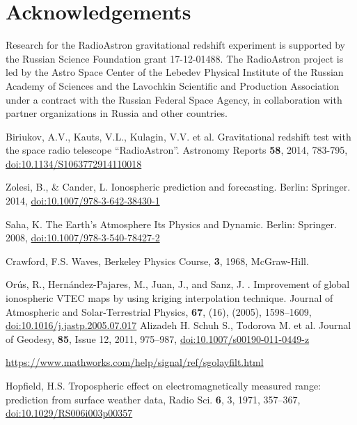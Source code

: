 \documentclass[a4paper,english,bopenany]{article}
\begin{document}
\section{Acknowledgements}

Research for the RadioAstron gravitational redshift experiment is supported by the Russian Science Foundation grant 17-12-01488. The RadioAstron project is led by the Astro Space Center of the Lebedev Physical Institute of
the Russian Academy of Sciences and the Lavochkin Scientific and Production Association under a contract with the Russian Federal Space Agency, in collaboration with partner organizations in Russia and other countries.


\newpage



\begin{center}\begin{thebibliography}{}
		Biriukov, A.V., Kauts, V.L., Kulagin, V.V. et al.  Gravitational redshift
		test with the space radio telescope “RadioAstron”. Astronomy Reports {\bf 58}, 2014,
		783-795,
		\href{https://doi.org/10.1134/S1063772914110018}{doi:10.1134/S1063772914110018}

		 Zolesi, B., \& Cander, L. Ionospheric prediction and forecasting. Berlin: Springer. 2014, \href{https://doi.org/10.1007/978-3-642-38430-1}{doi:10.1007/978-3-642-38430-1} 
		
		Saha, K. The Earth's Atmosphere Its Physics and Dynamic. Berlin: Springer. 2008,
		\href{http://dx.doi.org/10.1007/978-3-540-78427-2}{doi:10.1007/978-3-540-78427-2} 
		 
		Crawford, F.S. Waves, Berkeley Physics Course, \textbf{3}, 1968, McGraw-Hill.
		


		Orús, R., Hernández-Pajares, M., Juan, J., and Sanz, J. . Improvement of global ionospheric VTEC maps by using kriging interpolation technique. Journal of Atmospheric and Solar-Terrestrial Physics, \textbf{67}, (16), (2005), 1598–1609,
		\href{https://ui.adsabs.harvard.edu/link_gateway/2005JASTP..67.1598O/doi:10.1016/j.jastp.2005.07.017}{doi:10.1016/j.jastp.2005.07.017}
		  Alizadeh H. Schuh S., Todorova M. et al.  Journal of Geodesy,  \textbf{85}, Issue 12, 2011, 975–987, \href{https://doi.org/10.1007/s00190-011-0449-z}{doi:10.1007/s00190-011-0449-z} 
		
		

		
		 \href{https://www.mathworks.com/help/signal/ref/sgolayfilt.html}{https://www.mathworks.com/help/signal/ref/sgolayfilt.html}
		
	
		
		 Hopfield, H.S.  Tropospheric effect on electromagnetically measured range: prediction from surface weather data, Radio Sci. \textbf{6}, 3, 1971, 357–367,
		\href{https://doi.org/10.1007/s00190-011-0449-z}{doi:10.1029/RS006i003p00357}
		
	\end{thebibliography}
\end{center}
\end{document}
